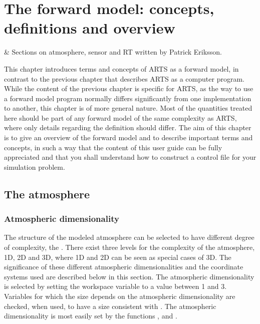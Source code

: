 \chapter{The forward model: concepts, definitions and overview}
 \label{sec:fm_defs}


 & Sections on atmosphere, sensor and RT written by Patrick Eriksson.\\
\stophistory




This chapter introduces terms and concepts of ARTS as a forward model,
in contrast to the previous chapter that describes ARTS as a computer
program. While the content of the previous chapter is specific for
ARTS, as the way to use a forward model program normally differs
significantly from one implementation to another, this chapter is of
more general nature. Most of the quantities treated here should be
part of any forward model of the same complexity as ARTS, where only
details regarding the definition should differ. The aim of this
chapter is to give an overview of the forward model and to describe
important terms and concepts, in such a way that the content of this user
guide can be fully appreciated and that you shall understand how to
construct a control file for your simulation problem.




\section{The atmosphere}
\label{sec:fm_defs:atmosphere}


\subsection{Atmospheric dimensionality}
\label{sec:fm_defs:atmdim}

The structure of the modeled atmosphere can be selected to have
different degree of complexity, the . There exist three levels for the complexity of the
atmosphere, 1D, 2D and 3D, where 1D and 2D can be seen as special
cases of 3D. The significance of these different atmospheric
dimensionalities and the coordinate systems used are described below
in this section. The atmospheric dimensionality is selected by setting
the workspace variable  to a value between 1
and 3. Variables for which the size depends on the atmospheric
dimensionality are checked, when used, to have a size consistent with
. The atmospheric dimensionality is most
easily set by the functions ,
 and .

